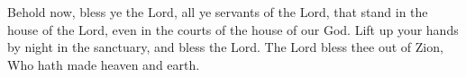 Behold now, bless ye the Lord, all ye servants of the Lord, that stand in the house of the Lord, even in the courts of the house of our God. Lift up your hands by night in the sanctuary, and bless the Lord. The Lord bless thee out of Zion, Who hath made heaven and earth.
